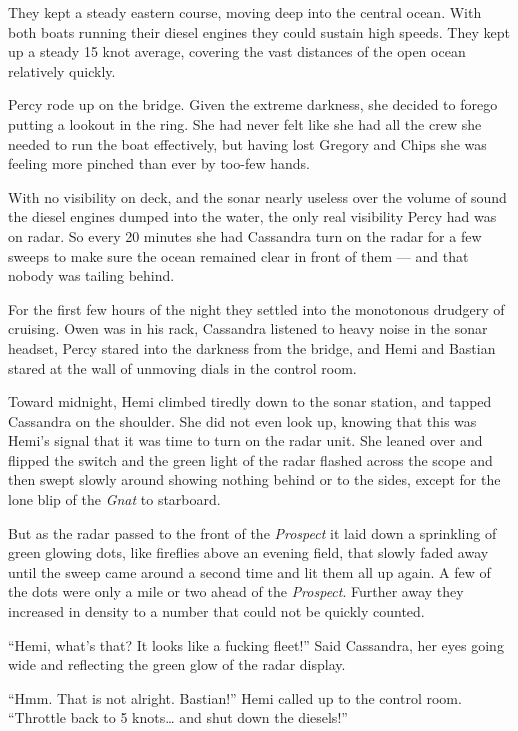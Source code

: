 \documentclass[]{scrbook}
\begin{document}
They kept a steady eastern course, moving deep into the central ocean.
With both boats running their diesel engines they could sustain high
speeds. They kept up a steady 15 knot average, covering the vast
distances of the open ocean relatively quickly.

Percy rode up on the bridge. Given the extreme darkness, she decided to
forego putting a lookout in the ring. She had never felt like she had
all the crew she needed to run the boat effectively, but having lost
Gregory and Chips she was feeling more pinched than ever by too-few
hands.

With no visibility on deck, and the sonar nearly useless over the volume
of sound the diesel engines dumped into the water, the only real
visibility Percy had was on radar. So every 20 minutes she had Cassandra
turn on the radar for a few sweeps to make sure the ocean remained clear
in front of them --- and that nobody was tailing behind.

For the first few hours of the night they settled into the monotonous
drudgery of cruising. Owen was in his rack, Cassandra listened to heavy
noise in the sonar headset, Percy stared into the darkness from the
bridge, and Hemi and Bastian stared at the wall of unmoving dials in the
control room.

Toward midnight, Hemi climbed tiredly down to the sonar station, and
tapped Cassandra on the shoulder. She did not even look up, knowing that
this was Hemi's signal that it was time to turn on the radar unit. She
leaned over and flipped the switch and the green light of the radar
flashed across the scope and then swept slowly around showing nothing
behind or to the sides, except for the lone blip of the \emph{Gnat} to
starboard.

But as the radar passed to the front of the \emph{Prospect} it laid down
a sprinkling of green glowing dots, like fireflies above an evening
field, that slowly faded away until the sweep came around a second time
and lit them all up again. A few of the dots were only a mile or two
ahead of the \emph{Prospect}. Further away they increased in density to
a number that could not be quickly counted.

``Hemi, what's that? It looks like a fucking fleet!'' Said Cassandra,
her eyes going wide and reflecting the green glow of the radar display.

``Hmm. That is not alright. Bastian!'' Hemi called up to the control
room. ``Throttle back to 5 knots\ldots{} and shut down the diesels!''
\end{document}
